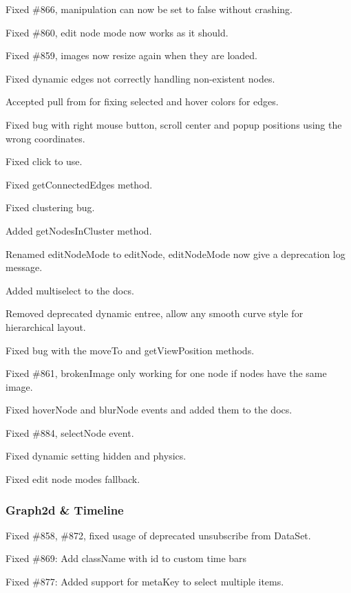 \begin{DoxyItemize}
\item Fixed \#866, manipulation can now be set to false without crashing.
\item Fixed \#860, edit node mode now works as it should.
\item Fixed \#859, images now resize again when they are loaded.
\item Fixed dynamic edges not correctly handling non-\/existent nodes.
\item Accepted pull from  for fixing selected and hover colors for edges.
\item Fixed bug with right mouse button, scroll center and popup positions using the wrong coordinates.
\item Fixed click to use.
\item Fixed get\+Connected\+Edges method.
\item Fixed clustering bug.
\item Added get\+Nodes\+In\+Cluster method.
\item Renamed edit\+Node\+Mode to edit\+Node, edit\+Node\+Mode now give a deprecation log message.
\item Added multiselect to the docs.
\item Removed deprecated dynamic entree, allow any smooth curve style for hierarchical layout.
\item Fixed bug with the move\+To and get\+View\+Position methods.
\item Fixed \#861, broken\+Image only working for one node if nodes have the same image.
\item Fixed hover\+Node and blur\+Node events and added them to the docs.
\item Fixed \#884, select\+Node event.
\item Fixed dynamic setting hidden and physics.
\item Fixed edit node mode\textquotesingle{}s fallback.
\end{DoxyItemize}

\subsubsection*{Graph2d \& Timeline}


\begin{DoxyItemize}
\item Fixed \#858, \#872, fixed usage of deprecated {\ttfamily unsubscribe} from Data\+Set.
\item Fixed \#869\+: Add class\+Name with id to custom time bars
\item Fixed \#877\+: Added support for meta\+Key to select multiple items.
\end{DoxyItemize}

